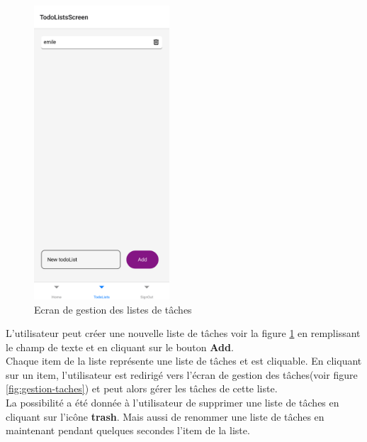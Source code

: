 \documentclass[12pt]{article}
\begin{document}
        \begin{figure}[H]
            \centering
            \includegraphics[width=0.45\textwidth]{images/taskList}
            \caption{Ecran de gestion des listes de tâches}
            \label{fig:gestion-listes}
        \end{figure}

        L'utilisateur peut créer une nouvelle liste de tâches voir la figure \ref{fig:gestion-listes} en remplissant
        le champ de texte et en cliquant sur le bouton \textbf{Add}.\\ Chaque item de la liste représente une liste de tâches
        et est cliquable. En cliquant sur un item, l'utilisateur est redirigé vers l'écran de gestion des tâches(voir figure \ref{fig:gestion-taches})
        et peut alors gérer les tâches de cette liste.\\
        La possibilité a été donnée à l'utilisateur de supprimer une liste de tâches en cliquant sur l'icône \textbf{trash}.
        Mais aussi de renommer une liste de tâches en maintenant pendant quelques secondes l'item de la liste.
\end{document}
